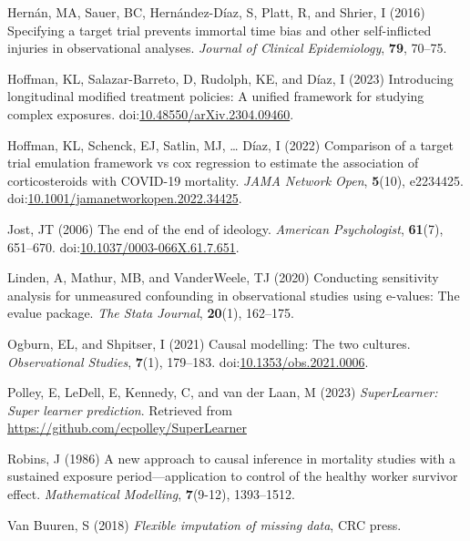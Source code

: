 \documentclass[
  singlecolumn]{article}
\newlength{\cslhangindent}
\newenvironment{CSLReferences}[2] %
 {\begin{list}{}{%
  \setlength{\itemindent}{0pt}
  \setlength{\leftmargin}{0pt}
  \setlength{\parsep}{0pt}
  \ifodd #1
   \setlength{\leftmargin}{\cslhangindent}
   \setlength{\itemindent}{-1\cslhangindent}
  \fi
  \setlength{\itemsep}{#2\baselineskip}}}
 {\end{list}}
\begin{document}
\begin{CSLReferences}{1}{0}
Hernán, MA, Sauer, BC, Hernández-Díaz, S, Platt, R, and Shrier, I (2016)
Specifying a target trial prevents immortal time bias and other
self-inflicted injuries in observational analyses. \emph{Journal of
Clinical Epidemiology}, \textbf{79}, 70--75.

Hoffman, KL, Salazar-Barreto, D, Rudolph, KE, and Díaz, I (2023)
Introducing longitudinal modified treatment policies: A unified
framework for studying complex exposures.
doi:\href{https://doi.org/10.48550/arXiv.2304.09460}{10.48550/arXiv.2304.09460}.

Hoffman, KL, Schenck, EJ, Satlin, MJ, \ldots{} Díaz, I (2022) Comparison
of a target trial emulation framework vs cox regression to estimate the
association of corticosteroids with COVID-19 mortality. \emph{JAMA
Network Open}, \textbf{5}(10), e2234425.
doi:\href{https://doi.org/10.1001/jamanetworkopen.2022.34425}{10.1001/jamanetworkopen.2022.34425}.

Jost, JT (2006) The end of the end of ideology. \emph{American
Psychologist}, \textbf{61}(7), 651--670.
doi:\href{https://doi.org/10.1037/0003-066X.61.7.651}{10.1037/0003-066X.61.7.651}.

Linden, A, Mathur, MB, and VanderWeele, TJ (2020) Conducting sensitivity
analysis for unmeasured confounding in observational studies using
e-values: The evalue package. \emph{The Stata Journal}, \textbf{20}(1),
162--175.

Ogburn, EL, and Shpitser, I (2021) Causal modelling: The two cultures.
\emph{Observational Studies}, \textbf{7}(1), 179--183.
doi:\href{https://doi.org/10.1353/obs.2021.0006}{10.1353/obs.2021.0006}.

Polley, E, LeDell, E, Kennedy, C, and van der Laan, M (2023)
\emph{SuperLearner: Super learner prediction}. Retrieved from
\url{https://github.com/ecpolley/SuperLearner}

Robins, J (1986) A new approach to causal inference in mortality studies
with a sustained exposure period---application to control of the healthy
worker survivor effect. \emph{Mathematical Modelling}, \textbf{7}(9-12),
1393--1512.

Van Buuren, S (2018) \emph{Flexible imputation of missing data}, CRC
press.


\end{CSLReferences}
\end{document}
